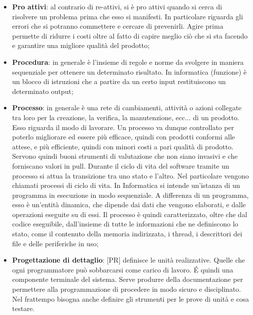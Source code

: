 \begin{itemize}
	\item \textbf{Pro attivi}: al contrario di re-attivi, si è pro attivi quando si cerca di risolvere un problema prima che esso si manifesti. In particolare riguarda gli errori che si potranno commettere e cercare di prevenirli. \newline
Agire prima permette di ridurre i costi oltre al fatto di capire meglio ciò che si sta facendo e garantire una migliore qualità del prodotto;

	\item \textbf{Procedura}: in generale è l'insieme di regole e norme da svolgere in maniera sequenziale per ottenere un determinato risultato. \newline
In informatica (funzione) è un blocco di istruzioni che a partire da un certo input restituiscono un determinato output;

	\item \textbf{Processo}:  in generale è una rete di cambiamenti, attività o azioni collegate tra loro per la creazione, la verifica, la manutenzione, ecc... di un prodotto. Esso riguarda il modo di lavorare. Un processo va dunque controllato per poterlo migliorare ed essere più efficace, quindi con prodotti conformi alle attese, e più efficiente, quindi con minori costi a pari qualità di prodotto. \newline
	Servono quindi buoni strumenti di valutazione che non siano invasivi e che forniscano valori in pull. \newline
	Durante il ciclo di vita del software tramite un processo si attua la transizione tra uno stato e l'altro. Nel particolare vengono chiamati processi di ciclo di vita. \newline
	In Informatica si intende un'istanza di un programma in esecuzione in modo sequenziale. A differenza di un programma, esso è un'entità dinamica, che dipende dai dati che vengono elaborati, e dalle operazioni eseguite su di essi. Il processo è quindi caratterizzato, oltre che dal codice eseguibile, dall'insieme di tutte le informazioni che ne definiscono lo stato, come il contenuto della memoria indirizzata, i thread, i descrittori dei file e delle periferiche in uso;

	\item \textbf{Progettazione di dettaglio}: [PR] definisce le unità realizzative. Quelle che ogni programmatore può sobbarcarsi come carico di lavoro. \'E quindi una componente terminale del sistema. Serve produrre della documentazione per permettere alla programmazione di procedere in modo sicuro e disciplinato. Nel frattempo bisogna anche definire gli strumenti per le prove di unità e cosa testare.


\end{itemize}
